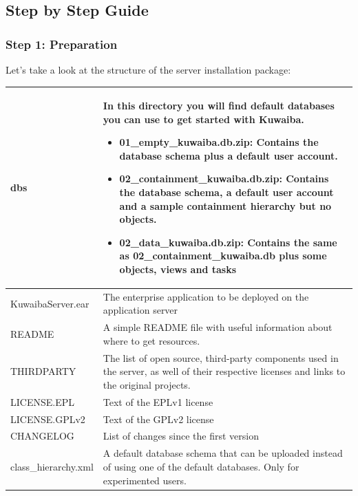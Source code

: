 \documentclass[a4paper]{article}
\begin{document}
		
		\newpage
		\subsection{Step by Step Guide}
		\subsubsection{Step 1: Preparation}
			Let's take a look at the structure of the server installation package:
			
			\begin{table}[h!]
				\begin{tabular}{p{5cm}p{10cm}}
					\toprule
					dbs & 
					In this directory you will find default databases you can use to get started with Kuwaiba.
					\begin{itemize}
						\item \textbf{01\_empty\_kuwaiba.db.zip}: Contains the database schema plus a default user account.
						\item \textbf{02\_containment\_kuwaiba.db.zip}: Contains the database schema, a default user account and a sample containment hierarchy but no objects.
						\item \textbf{02\_data\_kuwaiba.db.zip}: Contains the same as 02\_containment\_kuwaiba.db plus some objects, views and tasks 
						
					\end{itemize} \\
					\midrule
					KuwaibaServer.ear & The enterprise application to be deployed on the application server \\
					\midrule
					README & A simple README file with useful information about where to get resources. \\
					\midrule
					THIRDPARTY & The list of open source, third-party components used in the server, as well of their respective licenses and links to the original projects. \\
					\midrule
					LICENSE.EPL & Text of the EPLv1 license \\
					\midrule
					LICENSE.GPLv2 & Text of the GPLv2 license \\
					\midrule
					CHANGELOG & List of changes since the first version \\
					\midrule
					class\_hierarchy.xml & A default database schema that can be uploaded instead of using one of the default databases. Only for experimented users. \\
					\bottomrule	
				\end{tabular}
			\end{table}
\end{document}
